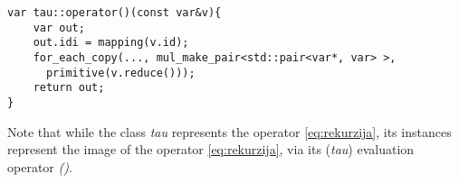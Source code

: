 \begin{lstlisting}
var tau::operator()(const var&v){
    var out;
    out.idi = mapping(v.id);
    for_each_copy(..., mul_make_pair<std::pair<var*, var> >, 
      primitive(v.reduce()));
    return out;
}
\end{lstlisting}
Note that while the class \emph{tau} represents the operator \eqref{eq:rekurzija}, its instances represent the image of the operator \eqref{eq:rekurzija}, via its (\emph{tau}) evaluation operator \emph{()}.
